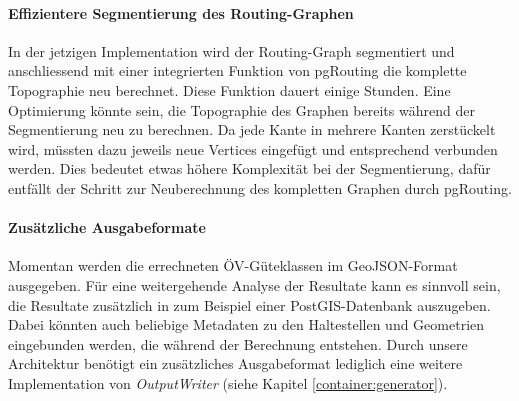 \paragraph{Effizientere Segmentierung des Routing-Graphen}
In der jetzigen Implementation wird der Routing-Graph segmentiert und anschliessend mit einer integrierten Funktion von pgRouting die komplette Topographie neu berechnet.
Diese Funktion dauert einige Stunden.
Eine Optimierung könnte sein, die Topographie des Graphen bereits während der Segmentierung neu zu berechnen.
Da jede Kante in mehrere Kanten zerstückelt wird, müssten dazu jeweils neue Vertices eingefügt und entsprechend verbunden werden.
Dies bedeutet etwas höhere Komplexität bei der Segmentierung, dafür entfällt der Schritt zur Neuberechnung des kompletten Graphen durch pgRouting.

\paragraph{Zusätzliche Ausgabeformate}
Momentan werden die errechneten \acs{ÖV}-Güteklassen im \gls{GeoJSON}-Format ausgegeben.
Für eine weitergehende Analyse der Resultate kann es sinnvoll sein, die Resultate zusätzlich in zum Beispiel einer PostGIS-Datenbank auszugeben.
Dabei könnten auch beliebige Metadaten zu den Haltestellen und Geometrien eingebunden werden, die während der Berechnung entstehen.
Durch unsere Architektur benötigt ein zusätzliches Ausgabeformat lediglich eine weitere Implementation von \emph{OutputWriter} (siehe Kapitel \ref{container:generator}).
